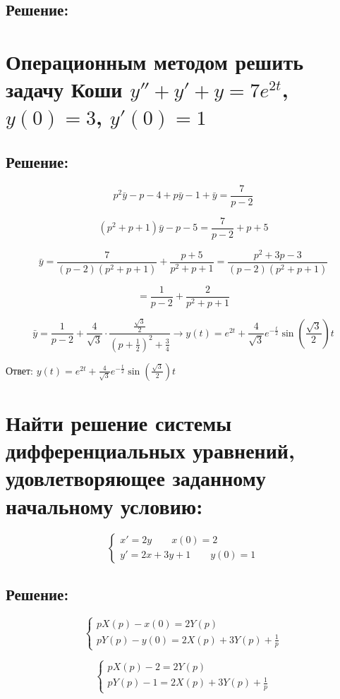 \documentclass{article}
\begin{document}
\subsection{Решение:}

\section{Операционным методом решить задачу Коши $y'' + y' + y = 7e^{2t}$, $y(0) = 3$, $y'(0) = 1$}
\subsection{Решение:}

\[
p^2 \bar{y} - p - 4 + p \bar{y} - 1 + \bar{y} = \frac{7}{p-2}
\]

\[
(p^2 + p + 1) \bar{y} - p - 5 = \frac{7}{p-2} + p + 5
\]

\[
\bar{y} = \frac{7}{(p-2)(p^2 + p + 1)} + \frac{p + 5}{p^2 + p + 1} = \frac{p^2 + 3p - 3}{(p-2)(p^2 + p + 1)}
\]

\[
= \frac{1}{p-2} + \frac{2}{p^2 + p + 1}
\]

\[
\bar{y} = \frac{1}{p-2} + \frac{4}{\sqrt{3}} \cdot \frac{\frac{\sqrt{3}}{2}}{\left(p + \frac{1}{2}\right)^2 + \frac{3}{4}} \to y(t) = e^{2t} + \frac{4}{\sqrt{3}} e^{-\frac{t}{2}} \sin\left(\frac{\sqrt{3}}{2}\right)t
\]

Ответ:
$
y(t) = e^{2t} + \frac{4}{\sqrt{3}} e^{-\frac{t}{2}} \sin\left(\frac{\sqrt{3}}{2}\right)t
$

\section{Найти решение системы дифференциальных уравнений, удовлетворяющее заданному начальному условию: }
\[
\begin{cases} x' = 2y \quad\quad x(0) = 2\\
y' = 2x + 3y + 1 \quad\quad y(0) = 1
\end{cases}
\]
\subsection{Решение:}

\[
\begin{cases}
pX(p) - x(0) = 2Y(p) \\
pY(p) - y(0) = 2X(p) + 3Y(p) + \frac{1}{p}
\end{cases}
\]

\[
\begin{cases}
pX(p) - 2 = 2Y(p) \\
pY(p) - 1 = 2X(p) + 3Y(p) + \frac{1}{p}
\end{cases}
\]
\end{document}

